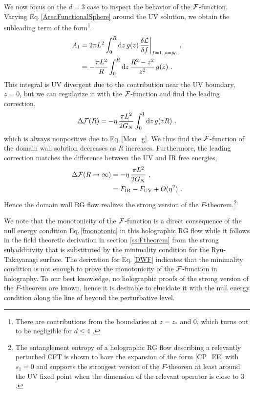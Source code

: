 We now focus on the $d=3$ case to inspect the behavior of the ${\cal F}$-function.
Varying Eq.\,\eqref{AreaFunctionalSphere} around the UV solution, we obtain the subleading term of the form\footnote{There are contributions from the boundaries at $z=z_\ast$ and $0$, which turns out to be negligible for $d\le 4$ \cite{Liu:2012eea}.}
\begin{align}
\begin{aligned}
A_1 &= 2\pi L^{2}\int_0^{R} \mathrm{d} z\, g(z)\, \frac{\delta {\cal L}}{\delta f}\bigg|_{f=1,\,\rho=\rho_0} \ , \\
	&= - \frac{\pi L^2}{R} \int_0^R \mathrm{d} z\, \frac{R^2 - z^2}{z^2}\,g(z) \ .
\end{aligned}
\end{align}
This integral is UV divergent due to the contribution near the UV boundary, $z=0$,
but we can regularize it with the ${\cal F}$-function and find the leading correction,
\begin{align}\label{DWF}
{\Delta}{\cal F} (R) = -\eta\, \frac{\pi L^2}{2G_N} \int_0^1 \mathrm{d} z \, g(zR) \ .
\end{align}
which is always nonpositive due to Eq.\,\eqref{Mon_g}.
We thus find the ${\cal F}$-function of the domain wall solution decreases as $R$ increases.
Furthermore, the leading correction matches the difference between the UV and IR free energies,
\begin{align}
\begin{aligned}
{\Delta} {\cal F} (R\to\infty) &= -\eta\, \frac{\pi L^2}{2G_N}\ , \\
	& = F_\text{IR} - F_\text{UV} + O(\eta^2)\ .
\end{aligned}
\end{align}
Hence the domain wall RG flow realizes the strong version of the $F$-theorem.\footnote{The entanglement entropy of a holographic RG flow describing a relevantly perturbed CFT is shown to have the expansion of the form \eqref{CP_EE} with $s_1=0$ and supports the strongest version of the $F$-theorem at least around the UV fixed point when the dimension of the relevant operator is close to $3$ \cite{Taylor:2016aoi,Taylor:2016kic}.}

We note that the monotonicity of the ${\cal F}$-function is a direct consequence of the null energy condition Eq.\,\eqref{fmonotonic} in this holographic RG flow while it follows  in the field theoretic derivation in section \ref{ss:Ftheorem} from the strong subadditivity that is substituted by the minimality condition for the Ryu-Takayanagi surface.
The derivation for Eq.\,\eqref{DWF} indicates that the minimality condition is not enough to prove the monotonicity of the ${\cal F}$-function in holography.
To our best knowledge, no holographic proofs of the strong version of the $F$-theorem are known, hence 
it is desirable to elucidate it with the null energy condition along the line of \textcite{Freedman:1999gp,Girardello:1998pd} beyond the perturbative level.


